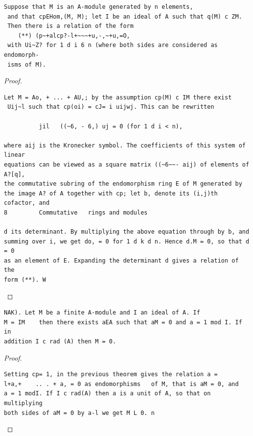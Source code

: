 \begin{theorem}\label{mcrt-auto-theorem-2-1}\uses{}
\begin{verbatim}
Suppose that M is an A-module generated by n elements,
 and that cpEHom,(M, M); let I be an ideal of A such that q(M) c ZM.
 Then there is a relation of the form
    (**) (p~+alcp?-l+~~~+u,-,~+u,=O,
 with Ui~Z? for 1 d i 6 n (where both sides are considered as endomorph-
 isms of M).
\end{verbatim}
\end{theorem}
\begin{proof}
\begin{verbatim}
Let M = Ao, + ... + AU,; by the assumption cp(M) c IM there exist
 Uij~l such that cp(oi) = cJ= i uijwj. This can be rewritten

          jil   ((~6, - 6,) uj = 0 (for 1 d i < n),

where aij is the Kronecker symbol. The coefficients of this system of linear
equations can be viewed as a square matrix ((~6~~- aij) of elements of A?[q],
the commutative subring of the endomorphism ring E of M generated by
the image A? of A together with cp; let b, denote its (i,j)th cofactor, and
8         Commutative   rings and modules

d its determinant. By multiplying the above equation through by b, and
summing over i, we get do, = 0 for 1 d k d n. Hence d.M = 0, so that d = 0
as an element of E. Expanding the determinant d gives a relation of the
form (**). W
\end{verbatim}
\end{proof}


\begin{theorem}\label{mcrt-auto-theorem-2-2}\uses{}
\begin{verbatim}
NAK). Let M be a finite A-module and I an ideal of A. If
M = IM    then there exists aEA such that aM = 0 and a = 1 mod I. If in
addition I c rad (A) then M = 0.
\end{verbatim}
\end{theorem}
\begin{proof}
\begin{verbatim}
Setting cp= 1, in the previous theorem gives the relation a =
l+a,+    .. . + a, = 0 as endomorphisms   of M, that is aM = 0, and
a = 1 modI. If I c rad(A) then a is a unit of A, so that on multiplying
both sides of aM = 0 by a-l we get M L 0. n
\end{verbatim}
\end{proof}


